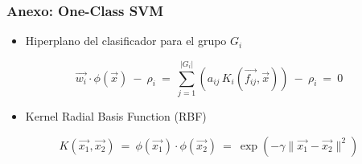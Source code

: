 \begin{frame}
    \frametitle{Anexo: One-Class SVM}

    \begin{itemize}
        \item
        \footnotesize Hiperplano del clasificador para el grupo $G_{i}$
    \end{itemize}

    \begin{equation}
        \vec{w_{i}} \cdot \phi(\vec{x})
        \ - \
        \rho_{i}
        \ = \
        \sum_{j=1}^{\lvert G_{i} \rvert}
        \left(
            a_{ij} \, K_{i}(\vec{f_{ij}}, \vec{x})
        \right)
        \ - \
        \rho_{i}
        \ = \
        0
    \end{equation}

    \begin{itemize}
        \item
        \footnotesize Kernel Radial Basis Function (RBF)
    \end{itemize}

    \begin{equation}
        K(\vec{x_{1}}, \vec{x_{2}})
        \ = \
        \phi(\vec{x_{1}}) \cdot \phi(\vec{x_{2}})
        \ = \
        \exp(
            - \gamma \lVert \vec{x_{1}} - \vec{x_{2}} \lVert^2
        )
    \end{equation}
\end{frame}

